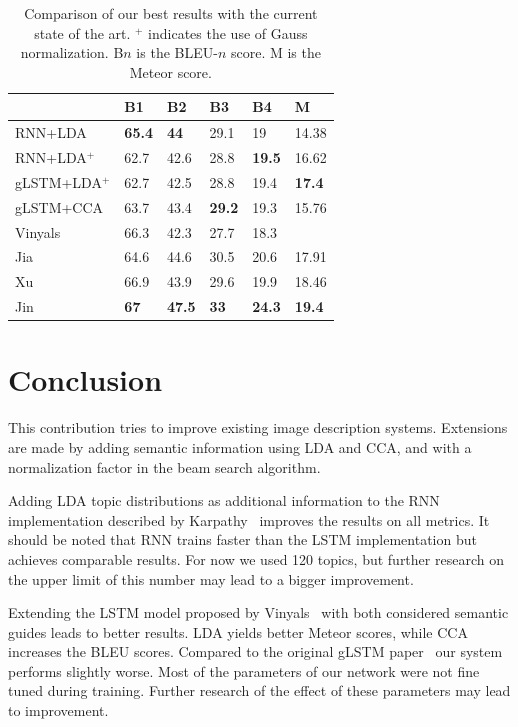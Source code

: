 \documentclass[twoside,twocolumn]{article}
\begin{document}
	\begin{table}
		\centering
		\begin{tabular}{llllll}
			~                  & B1 & B2 & B3 & B4 & M \\ \hline
			RNN+LDA            & \textbf{65.4}   & \textbf{44}     & 29.1   & 19     & 14.38  \\
			RNN+LDA$^+$      & 62.7   & 42.6   & 28.8   & \textbf{19.5}   & 16.62  \\
			gLSTM+LDA$^+$    & 62.7   & 42.5   & 28.8   & 19.4   & \textbf{17.4}   \\
			gLSTM+CCA          & 63.7   & 43.4   & \textbf{29.2}   & 19.3   & 15.76  \\ \hline
			Vinyals~\cite{Google}           & 66.3   & 42.3   & 27.7   & 18.3   & ~      \\
			Jia~\cite{Fernando2015}  & 64.6   & 44.6   & 30.5   & 20.6   & 17.91  \\
			Xu~\cite{Xu2015}     & 66.9   & 43.9   & 29.6   & 19.9   & 18.46  \\
			Jin~\cite{Jin2015}      & \textbf{67}    & \textbf{47.5}   & \textbf{33}     & \textbf{24.3}   & \textbf{19.4}   \\ \hline
		\end{tabular}
		\caption{Comparison of our best results with the current state of the art. $^+$ indicates the use of Gauss normalization. B$n$ is the BLEU-$n$ score. M is the Meteor score.}
		\label{tab:sota}
	\end{table}
	
	\section{Conclusion}
	This contribution tries to improve existing image description systems. Extensions are made by adding semantic information using LDA and CCA, and with a normalization factor in the beam search algorithm.
	
	Adding LDA topic distributions as additional information to the RNN implementation described by Karpathy~\cite{Karpathy2015} improves the results on all metrics. It should be noted that RNN trains faster than the LSTM implementation but achieves comparable results. For now we used 120 topics, but further research on the upper limit of this number may lead to a bigger improvement.
	
	Extending the LSTM model proposed by Vinyals~\cite{Google} with both considered semantic guides leads to better results. LDA yields better Meteor scores, while CCA increases the BLEU scores. Compared to the original gLSTM paper~\cite{Fernando2015} our system performs slightly worse. Most of the parameters of our network were not fine tuned during training. Further research of the effect of these parameters may lead to improvement.
	
\end{document}
